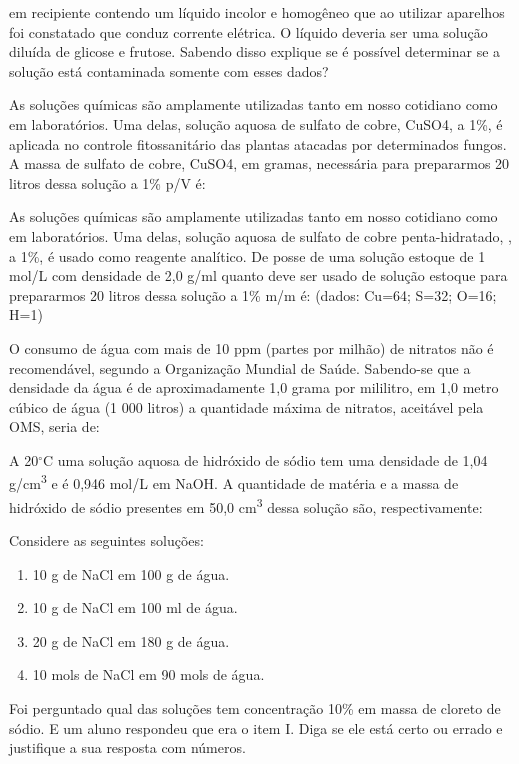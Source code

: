 \documentclass[a4paper,12]{exam}
\begin{document}
\begin{multicols}{2}
  	\begin{questions}
	  \question em recipiente contendo um líquido incolor e homogêneo que ao utilizar aparelhos foi constatado que conduz corrente elétrica. O líquido deveria ser uma solução diluída de glicose e frutose. Sabendo disso explique se é possível determinar se a solução está contaminada somente com esses dados? 
	  \fillwithlines{8em}
	  
	  \question As soluções químicas são amplamente utilizadas tanto em nosso cotidiano como em
	  laboratórios. Uma delas, solução aquosa de sulfato de cobre, CuSO4, a 1\%, é aplicada no controle
	  fitossanitário das plantas atacadas por determinados fungos. A massa de sulfato de cobre,
	  CuSO4, em gramas, necessária para prepararmos 20 litros dessa solução a 1\% p/V é:
	  \makeemptybox{2cm}
	  
	  \question As soluções químicas são amplamente utilizadas tanto em nosso cotidiano como em
laboratórios. Uma delas, solução aquosa de sulfato de cobre penta-hidratado, , a 1\%, é usado como reagente analítico. De posse de uma solução estoque de 1 mol/L com densidade de 2,0 g/ml quanto deve ser usado de solução estoque para prepararmos 20 litros dessa solução a 1\% m/m é: (dados: Cu=64; S=32; O=16; H=1)
	  \makeemptybox{2cm}

		\question O consumo de água com mais de 10 ppm (partes por milhão) de nitratos
não é recomendável, segundo a Organização Mundial de Saúde. Sabendo-se que a densidade da
água é de aproximadamente 1,0 grama por mililitro, em 1,0 metro cúbico de água (1 000 litros)
a quantidade máxima de nitratos, aceitável pela OMS, seria de:
		\makeemptybox{2cm}
	
	\question A 20$^{\circ}$C uma solução aquosa de hidróxido de sódio tem uma densidade de 1,04 \si{g/cm^3} e
é 0,946 mol/L em NaOH. A quantidade de matéria e a massa de hidróxido de sódio presentes em 50,0 \si{cm^3}
dessa solução são, respectivamente:\makeemptybox{2cm}
	
	\question Considere as seguintes soluções:
	\begin{enumerate}[label=\Roman*-]
		\item 10 g de NaCl em 100 g de água.
		\item 10 g de NaCl em 100 ml de água.
		\item 20 g de NaCl em 180 g de água.
		\item 10 mols de NaCl em 90 mols de água.
	\end{enumerate}
	Foi perguntado qual das soluções tem concentração 10\% em massa de cloreto de sódio. E um aluno respondeu que era o item I. Diga se ele está certo ou errado e justifique a sua resposta com números. \makeemptybox{2cm}


\end{questions}
\end{multicols}
\end{document}
